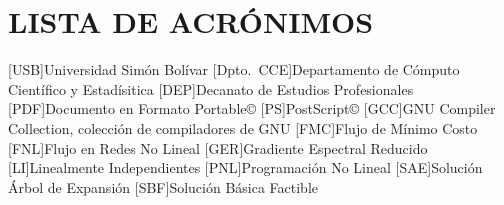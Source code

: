 
\chapter*{LISTA DE ACR\'ONIMOS}
\begin{acronym}
[USB]{Universidad Sim\'on Bol\'ivar}
[Dpto.~CCE]{Departamento de Cómputo Científico y Estadísitica}
[DEP]{Decanato de Estudios Profesionales}
[PDF]{Documento en Formato Portable\copyright}
[PS]{PostScript\copyright}
[GCC]{GNU Compiler Collection, colección de compiladores de GNU}
[FMC]{Flujo de Mínimo Costo}
[FNL]{Flujo en Redes No Lineal}
[GER]{Gradiente Espectral Reducido}
[LI]{Linealmente Independientes}
[PNL]{Programaci\'on No Lineal}
[SAE]{Soluci\'on \'Arbol de Expansi\'on}
[SBF]{Soluci\'on B\'asica Factible}
\end{acronym}
\clearpage